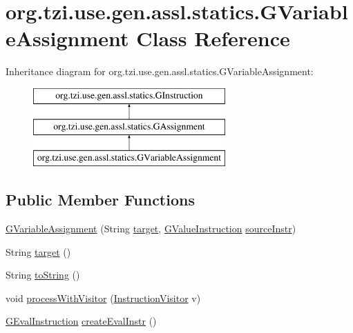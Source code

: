 \hypertarget{classorg_1_1tzi_1_1use_1_1gen_1_1assl_1_1statics_1_1_g_variable_assignment}{\section{org.\-tzi.\-use.\-gen.\-assl.\-statics.\-G\-Variable\-Assignment Class Reference}
\label{classorg_1_1tzi_1_1use_1_1gen_1_1assl_1_1statics_1_1_g_variable_assignment}
}
Inheritance diagram for org.\-tzi.\-use.\-gen.\-assl.\-statics.\-G\-Variable\-Assignment\-:\begin{figure}[H]
\begin{center}
\leavevmode
\includegraphics[height=3.000000cm]{classorg_1_1tzi_1_1use_1_1gen_1_1assl_1_1statics_1_1_g_variable_assignment}
\end{center}
\end{figure}
\subsection*{Public Member Functions}
\begin{DoxyCompactItemize}
\item 
\hyperlink{classorg_1_1tzi_1_1use_1_1gen_1_1assl_1_1statics_1_1_g_variable_assignment_acfb849b1eef6c5f7c0bb8f53a02eb86e}{G\-Variable\-Assignment} (String \hyperlink{classorg_1_1tzi_1_1use_1_1gen_1_1assl_1_1statics_1_1_g_variable_assignment_a0ca154c1df967d1000bf583280af313a}{target}, \hyperlink{interfaceorg_1_1tzi_1_1use_1_1gen_1_1assl_1_1statics_1_1_g_value_instruction}{G\-Value\-Instruction} \hyperlink{classorg_1_1tzi_1_1use_1_1gen_1_1assl_1_1statics_1_1_g_assignment_a02b5780dc7c85dd4ef76d0a5c15cec4b}{source\-Instr})
\item 
String \hyperlink{classorg_1_1tzi_1_1use_1_1gen_1_1assl_1_1statics_1_1_g_variable_assignment_a0ca154c1df967d1000bf583280af313a}{target} ()
\item 
String \hyperlink{classorg_1_1tzi_1_1use_1_1gen_1_1assl_1_1statics_1_1_g_variable_assignment_a66b4fd4567b7dec459705400ef5b39dd}{to\-String} ()
\item 
void \hyperlink{classorg_1_1tzi_1_1use_1_1gen_1_1assl_1_1statics_1_1_g_variable_assignment_aef1cc08a101dbbc8fd039deda78e823f}{process\-With\-Visitor} (\hyperlink{interfaceorg_1_1tzi_1_1use_1_1gen_1_1assl_1_1statics_1_1_instruction_visitor}{Instruction\-Visitor} v)
\item 
\hyperlink{classorg_1_1tzi_1_1use_1_1gen_1_1assl_1_1dynamics_1_1_g_eval_instruction}{G\-Eval\-Instruction} \hyperlink{classorg_1_1tzi_1_1use_1_1gen_1_1assl_1_1statics_1_1_g_variable_assignment_aeead24a3c10156afa82f970447762f90}{create\-Eval\-Instr} ()
\end{DoxyCompactItemize}
